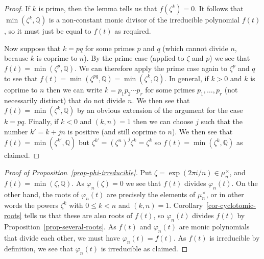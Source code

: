 \documentclass{amsart}
\newcommand{\Q}         {{\mathbb{Q}}}
\newcommand{\zt}        {\zeta}
\newcommand{\vph}       {\varphi}
\newcommand{\tm}        {\times}
\renewcommand{\:}{\colon}
\theoremstyle{definition}
\begin{document}
\begin{proof}
 If $k$ is prime, then the lemma tells us that $f(\zt^k)=0$.  It
 follows that $\min(\zt^k,\Q)$ is a non-constant monic divisor of the
 irreducible polynomial $f(t)$, so it must just be equal to $f(t)$ as
 required. 

 Now suppose that $k=pq$ for some primes $p$ and $q$ (which cannot
 divide $n$, because $k$ is coprime to $n$).  By the prime
 case (applied to $\zt$ and $p$) we see that $f(t)=\min(\zt^p,\Q)$.
 We can therefore apply the prime case again to $\zt^p$ and $q$ to see
 that $f(t)=\min(\zt^{pq},\Q)=\min(\zt^k,\Q)$.  In general, if $k>0$
 and $k$ is coprime to $n$ then we can write $k=p_1p_2\dotsb p_r$ for
 some primes $p_1,\dotsc,p_r$ (not necessarily distinct) that do not
 divide $n$.  We then see that $f(t)=\min(\zt^k,\Q)$ by an obvious
 extension of the argument for the case $k=pq$.  Finally, if $k<0$ and
 $(k,n)=1$ then we can choose $j$ such that the number $k'=k+jn$ is
 positive (and still coprime to $n$).  We then see that
 $f(t)=\min(\zt^{k'},\Q)$ but $\zt^{k'}=(\zt^n)^j\zt^k=\zt^k$ so
 $f(t)=\min(\zt^k,\Q)$ as claimed.
\end{proof}

\begin{proof}[Proof of Proposition~\ref{prop-phi-irreducible}]
 Put $\zt=\exp(2\pi i/n)\in\mu_n^\tm$, and $f(t)=\min(\zt,\Q)$.  As
 $\vph_n(\zt)=0$ we see that $f(t)$ divides $\vph_n(t)$.  On the other
 hand, the roots of $\vph_n(t)$ are precisely the elements of
 $\mu_n^\tm$, or in other words the powers $\zt^k$ with $0\leq k<n$
 and $(k,n)=1$.  Corollary~\ref{cor-cyclotomic-roots} tells us that
 these are also roots of $f(t)$, so $\vph_n(t)$ divides $f(t)$ by
 Proposition~\ref{prop-several-roots}.  As $f(t)$ and $\vph_n(t)$ are
 monic polynomials that divide each other, we must have
 $\vph_n(t)=f(t)$.  As $f(t)$ is irreducible by definition, we see
 that $\vph_n(t)$ is irreducible as claimed.
\end{proof}
\end{document}
